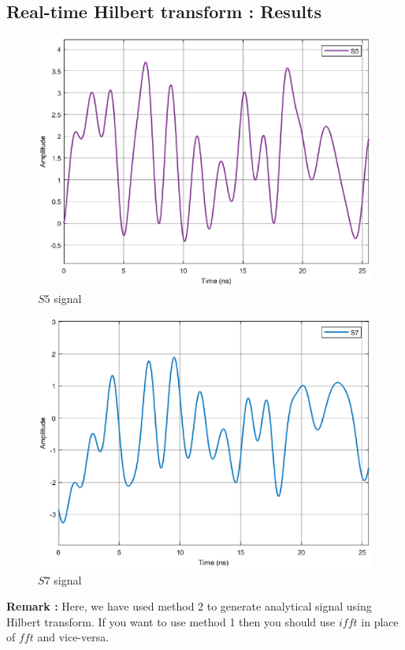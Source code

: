 \begin{refsection}
\subsection*{Real-time Hilbert transform : Results}
\begin{figure}[h]
	\centering
	\includegraphics[width=13cm]{./algorithms/hilbert/figures/S5.eps}
	\caption{$S5$ signal}\label{S5}
\end{figure}
\begin{figure}[h]
	\centering
	\includegraphics[width=13cm]{./algorithms/hilbert/figures/S7.eps}
	\caption{$S7$ signal}\label{S7}
\end{figure}
\textbf{Remark :} Here, we have used method 2 to generate analytical signal using Hilbert transform. If you want to use method 1 then you should use $ifft$ in place of $fft$ and vice-versa.



\clearpage
\printbibliography[heading=subbibliography]
\end{refsection}
\cleardoublepage

